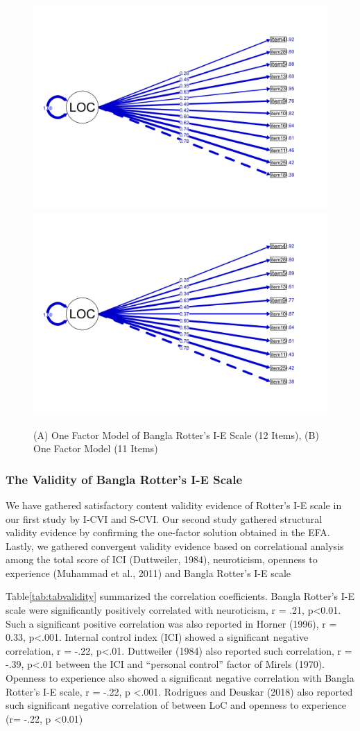 \documentclass[
  english,
  man]{apa6}
\begin{document}
\begin{figure}
\includegraphics[width=0.5\linewidth]{Rotterpaper_files/figure-latex/figcfa-1} \includegraphics[width=0.5\linewidth]{Rotterpaper_files/figure-latex/figcfa-2} \caption{(A) One Factor Model of Bangla Rotter's I-E Scale (12 Items), (B) One Factor Model (11 Items)}\label{fig:figcfa}
\end{figure}

\hypertarget{the-validity-of-bangla-rotters-i-e-scale}{%
\subsubsection{The Validity of Bangla Rotter's I-E Scale}\label{the-validity-of-bangla-rotters-i-e-scale}}

We have gathered satisfactory content validity evidence of Rotter's I-E scale in our first study by I-CVI and S-CVI. Our second study gathered structural validity evidence by confirming the one-factor solution obtained in the EFA. Lastly, we gathered convergent validity evidence based on correlational analysis among the total score of ICI (Duttweiler, 1984), neuroticism, openness to experience (Muhammad et al., 2011) and Bangla Rotter's I-E scale

Table\ref{tab:tabvalidity} summarized the correlation coefficients. Bangla Rotter's I-E scale were significantly positively correlated with neuroticism, r = .21, p\textless0.01. Such a significant positive correlation was also reported in Horner (1996), r = 0.33, p\textless.001. Internal control index (ICI) showed a significant negative correlation, r = -.22, p\textless.01. Duttweiler (1984) also reported such correlation, r = -.39, p\textless.01 between the ICI and ``personal control'' factor of Mirels (1970). Openness to experience also showed a significant negative correlation with Bangla Rotter's I-E scale, r = -.22, p \textless.001. Rodrigues and Deuskar (2018) also reported such significant negative correlation of between LoC and openness to experience (r= -.22, p \textless0.01)
\end{document}
